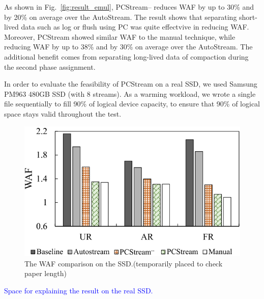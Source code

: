 As shown in Fig.~\ref{fig:result_emul}, 
{\sf PCStream--} reduces WAF by up to 30\% and by 20\% on average
over the AutoStream. 
The result shows that separating short-lived data such as log or flush
using PC was quite effectvive in reducing WAF.
Moreover, {\sf PCStream} showed similar WAF to the manual technique,
while reducing WAF by up to 38\% and by 30\% on average
over the AutoStream.
The additional benefit comes from separating
long-lived data of compaction during the
second phase assignment.

In order to evaluate the feasibility of {\sf PCStream} on a real SSD,
we used Samsung PM963 480GB SSD (with 8 streams).
As a warming workload, we wrote a single file sequentially to fill 90\%
of logical device capacity, to ensure that 90\% of logical space stays valid
throughout the test.

\begin{figure}[t]
	\centering
	\includegraphics[width=0.8\linewidth]{figure/result_emul}
	\vspace{-10pt}
	\caption{The WAF comparison on the SSD.(temporarily placed to check paper length)}
	\label{fig:result_SSD}
	\vspace{-15pt}
\end{figure}

\vspace{5cm}
\textcolor{blue}{Space for explaining the result on the real SSD.}
\vspace{5cm}
